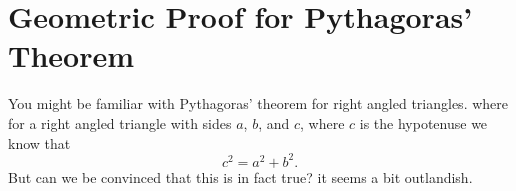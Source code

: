 \documentclass[a4paper,12pt]{article}
\begin{document}
\section*{Geometric Proof for Pythagoras' Theorem}

You might be familiar with Pythagoras' theorem for right angled
triangles. where for a right angled triangle with sides $a$, $b$, 
and $c$, where $c$ is the hypotenuse we know that 
$$c^2 = a^2 + b^2.$$
But can we be convinced that this is in fact true? it seems a 
bit outlandish.
\end{document}
